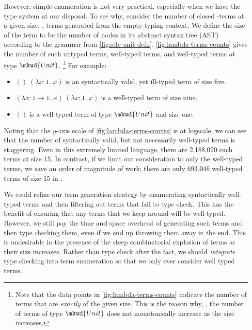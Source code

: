 

However, simple enumeration is not very practical, especially when we have the type system at our disposal.
To see why, consider the number of closed \stlcu-terms at a given size, \ie, terms generated from the empty typing context.
We define the size of the term to be the number of nodes in its abstract syntax tree (AST) according to the grammar from \autoref{fig:stlc-unit-defn}.
\autoref{fig:lambda-terms-counts} gives the number of such untyped terms, well-typed terms, and well-typed terms at type $\mkwd{Unit}$.
\footnote{%
  Note that the data points in \autoref{fig:lambda-terms-counts} indicate the number of terms that are \emph{exactly} of the given size.
  This is the reason why, \eg, the number of terms of type $\mkwd{Unit}$ does not monotonically increase as the size increases.
}
For example:
\begin{itemize}
  \item $()\;(λx:1.\;x)$ is an syntactically valid, yet ill-typed term of size five.
  \item $(λx:1 → 1.\;x)\;(λx:1.\;x)$ is a well-typed term of size nine.
  \item $()$ is a well-typed term of type $\mkwd{Unit}$ and size one.
\end{itemize}

Noting that the $y$-axis scale of \autoref{fig:lambda-terms-counts} is at logscale, we can see that the number of syntactically valid, but not necessarily well-typed terms is staggering.
Even in this extremely limited language, there are 2,188,020 such terms at size 15.
In contrast, if we limit our consideration to only the well-typed terms, we save an order of magnitude of work; there are only 693,046 well-typed terms of size 15 in \stlcu.~

We could refine our term generation strategy by enumerating syntactically well-typed terms and then filtering out terms that fail to type check.
This has the benefit of ensuring that any terms that we keep around will be well-typed.
However, we still pay the time and space overhead of generating such terms and then type checking them, even if we end up throwing them away in the end.
This is undesirable in the presence of the steep combinatorial explosion of terms as their size increases.
Rather than type check after the fact, we should \emph{integrate} type checking into term enumeration so that we only ever consider well typed terms.

